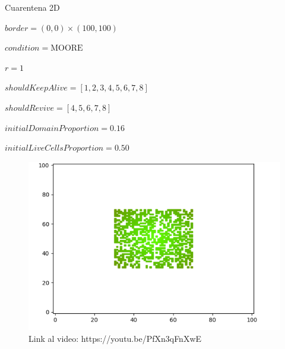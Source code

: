 \begin{frame}{Cuarentena 2D}
    \begin{multicols}{2}
        {
            $border = (0, 0) \times (100, 100)$

            $condition = \text{MOORE}$

            $r = 1$

            $shouldKeepAlive = [1, 2, 3, 4, 5, 6, 7, 8]$

            $shouldRevive = [4, 5, 6, 7, 8]$

            $initialDomainProportion = 0.16$

            $initialLiveCellsProportion = 0.50$
        }

        {\begin{figure}[H]
             \centering
             \includegraphics[width=1\linewidth]{pic/cuarentena2d/thumbnail_i50}
             \captionsetup{labelformat=empty}
             \caption{Link al video: https://youtu.be/PfXn3qFnXwE}
             \label{fig:cuarentena2D:thumbnail}
        \end{figure}}
    \end{multicols}
\end{frame}


